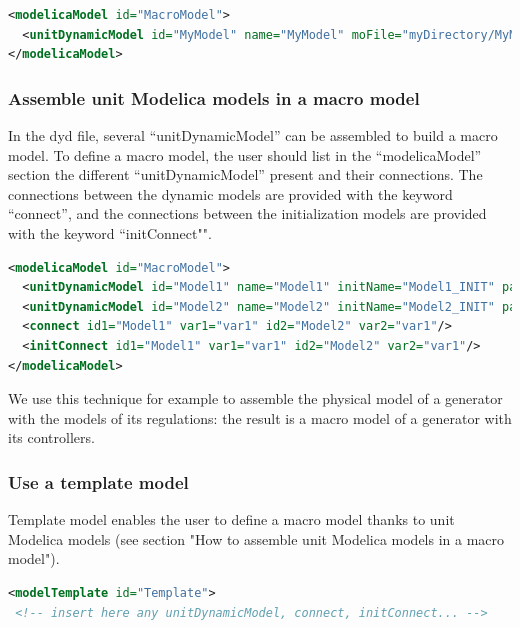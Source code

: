 \documentclass[a4paper, 12pt]{report}
\begin{document}
\begin{lstlisting}[language=XML, morekeywords={moFile, initFile}]
<modelicaModel id="MacroModel">
  <unitDynamicModel id="MyModel" name="MyModel" moFile="myDirectory/MyModel.mo" initFile="myDirectory/MyModel_INIT.mo" parFile="MyPar.par" parId="1"/>
</modelicaModel>
\end{lstlisting}

\subsubsection{Assemble unit Modelica models in a macro model}

In the dyd file, several ``unitDynamicModel'' can be assembled to build a macro model. To define a macro model, the user should list in the ``modelicaModel'' section the different ``unitDynamicModel'' present and their connections. The connections between the dynamic models are provided with the keyword ``connect'', and the connections between the initialization models are provided with the keyword ``initConnect"".

\begin{lstlisting}[language=XML, morekeywords={unitDynamicModel, connect, initConnect}]
<modelicaModel id="MacroModel">
  <unitDynamicModel id="Model1" name="Model1" initName="Model1_INIT" parFile="MyPar.par" parId="2"/>
  <unitDynamicModel id="Model2" name="Model2" initName="Model2_INIT" parFile="MyPar.par" parId="3"/>
  <connect id1="Model1" var1="var1" id2="Model2" var2="var1"/>
  <initConnect id1="Model1" var1="var1" id2="Model2" var2="var1"/>
</modelicaModel>
\end{lstlisting}

We use this technique for example to assemble the physical model of a generator with the models of its regulations: the result is a macro model of a generator with its controllers.

\subsubsection{Use a template model}

Template model enables the user to define a macro model thanks to unit Modelica models (see section "How to assemble unit Modelica models in a macro model").

\begin{lstlisting}[language=XML]
<modelTemplate id="Template">
 <!-- insert here any unitDynamicModel, connect, initConnect... -->
\end{lstlisting}
\end{document}
